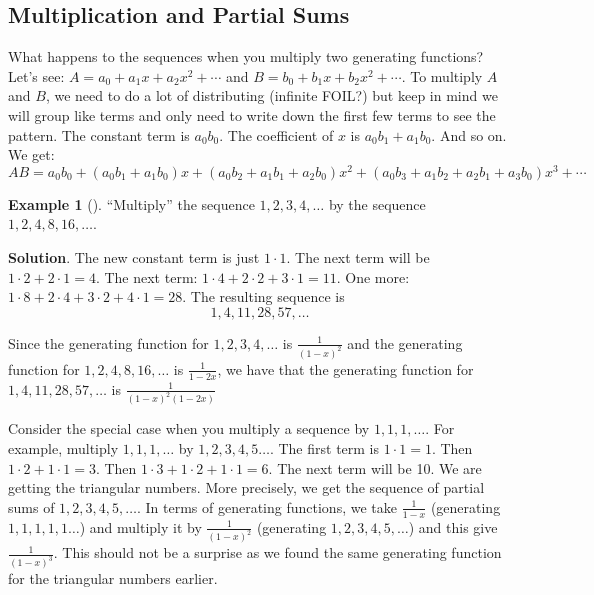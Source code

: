 \documentclass[10pt,]{book}
\theoremstyle{plain}
\theoremstyle{definition}
\theoremstyle{definition}
\newtheorem{example}[theorem]{Example}
\theoremstyle{definition}
\theoremstyle{definition}
\numberwithin{equation}{chapter}
\begin{document}
\subsection[{Multiplication and Partial Sums}]{Multiplication and Partial Sums}\label{subsection-23}
\hypertarget{p-993}{}%
What happens to the sequences when you multiply two generating functions? Let's see: \(A = a_0 + a_1x + a_2x^2 + \cdots\) and \(B = b_0 + b_1x + b_2x^2 + \cdots\). To multiply \(A\) and \(B\), we need to do a lot of distributing (infinite FOIL?) but keep in mind we will group like terms and only need to write down the first few terms to see the pattern. The constant term is \(a_0b_0\). The coefficient of \(x\) is \(a_0b_1 + a_1b_0\). And so on. We get:%
\begin{equation*}
AB = a_0b_0 + (a_0b_1 + a_1b_0)x + (a_0b_2 + a_1b_1 + a_2b_0)x^2 + (a_0b_3 + a_1b_2 + a_2b_1 + a_3b_0)x^3 + \cdots
\end{equation*}
%
\begin{example}[]\label{example-26}
\hypertarget{p-994}{}%
``Multiply'' the sequence \(1, 2, 3, 4, \ldots\) by the sequence \(1, 2, 4, 8, 16, \ldots\).%
\par\smallskip%
\noindent\textbf{Solution}.\hypertarget{solution-98}{}\quad%
\hypertarget{p-995}{}%
The new constant term is just \(1 \cdot 1\). The next term will be \(1\cdot 2 + 2 \cdot 1 = 4\). The next term: \(1 \cdot 4 + 2 \cdot 2 + 3 \cdot 1 = 11\). One more: \(1 \cdot 8 + 2 \cdot 4 + 3 \cdot 2 + 4 \cdot 1 = 28\). The resulting sequence is%
\begin{equation*}
1, 4, 11, 28, 57, \ldots
\end{equation*}
%
\par
\hypertarget{p-996}{}%
Since the generating function for \(1,2,3,4, \ldots\) is \(\frac{1}{(1-x)^2}\) and the generating function for \(1,2,4,8, 16, \ldots\) is \(\frac{1}{1-2x}\), we have that the generating function for \(1,4, 11, 28, 57, \ldots\) is \(\frac{1}{(1-x)^2(1-2x)}\)%
\end{example}
\hypertarget{p-997}{}%
Consider the special case when you multiply a sequence by \(1, 1, 1, \ldots\). For example, multiply \(1,1,1,\ldots\) by \(1, 2, 3, 4, 5\ldots\). The first term is \(1\cdot 1 = 1\). Then \(1\cdot 2 + 1 \cdot 1 = 3\). Then \(1\cdot 3 + 1\cdot 2 + 1 \cdot 1 = 6\). The next term will be 10. We are getting the triangular numbers. More precisely, we get the sequence of partial sums of \(1,2,3,4,5, \ldots\). In terms of generating functions, we take \(\frac{1}{1-x}\) (generating \(1,1,1,1,1\ldots\)) and multiply it by \(\frac{1}{(1-x)^2}\) (generating \(1,2,3,4,5,\ldots\)) and this give \(\frac{1}{(1-x)^3}\). This should not be a surprise as we found the same generating function for the triangular numbers earlier.%
\end{document}
